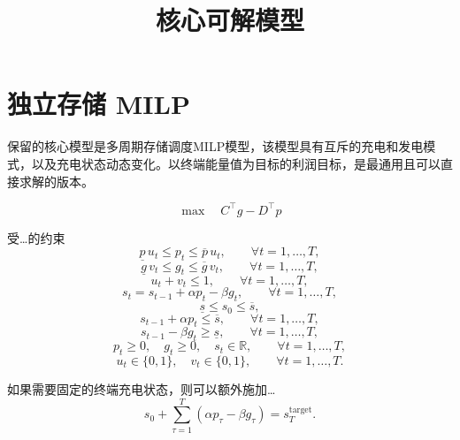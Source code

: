 \documentclass[11pt,a4paper]{article}
\title{核心可解模型}
\author{}
\date{}
\begin{document}
\maketitle

\section*{独立存储 MILP}
保留的核心模型是多周期存储调度MILP模型，该模型具有互斥的充电和发电模式，以及充电状态动态变化。以终端能量值为目标的利润目标，是最通用且可以直接求解的版本。

\begin{equation}
\max \quad C^\top g - D^\top p
\tag{M1}
\end{equation}

受…的约束
\begin{equation}
\underline{p}\, u_t \le p_t \le \overline{p}\, u_t,
\qquad \forall t=1,\dots,T,
\tag{M2}
\end{equation}
\begin{equation}
\underline{g}\, v_t \le g_t \le \overline{g}\, v_t,
\qquad \forall t=1,\dots,T,
\tag{M3}
\end{equation}
\begin{equation}
u_t + v_t \le 1,
\qquad \forall t=1,\dots,T,
\tag{M4}
\end{equation}
\begin{equation}
s_t = s_{t-1} + \alpha p_t - \beta g_t,
\qquad \forall t=1,\dots,T,
\tag{M5}
\end{equation}
\begin{equation}
\underline{s} \le s_0 \le \overline{s},
\tag{M6}
\end{equation}
\begin{equation}
s_{t-1} + \alpha p_t \le \overline{s},
\qquad \forall t=1,\dots,T,
\tag{M7}
\end{equation}
\begin{equation}
s_{t-1} - \beta g_t \ge \underline{s},
\qquad \forall t=1,\dots,T,
\tag{M8}
\end{equation}
\begin{equation}
p_t \ge 0,\quad g_t \ge 0,\quad s_t \in \mathbb{R},
\qquad \forall t=1,\dots,T,
\tag{M9}
\end{equation}
\begin{equation}
u_t \in \{0,1\},\quad v_t \in \{0,1\},
\qquad \forall t=1,\dots,T.
\tag{M10}
\end{equation}

\noindent
如果需要固定的终端充电状态，则可以额外施加…
\begin{equation}
s_0 + \sum_{\tau=1}^T (\alpha p_\tau - \beta g_\tau) = s_T^{\mathrm{target}}.
\tag{M11}
\end{equation}
\end{document}
